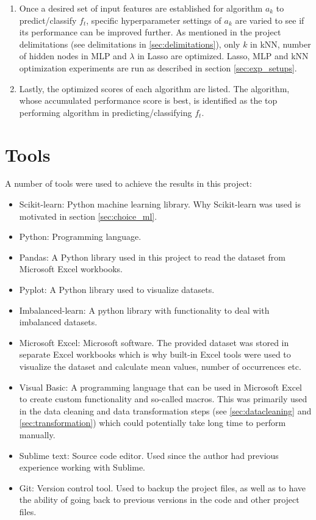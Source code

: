 \begin{enumerate}
			\item Once a desired set of input features are established for algorithm $a_k$ to predict/classify $f_t$, specific hyperparameter settings of $a_k$ are varied to see if its performance can be improved further. As mentioned in the project delimitations (see delimitations in \ref{sec:delimitations}), only $k$ in kNN, number of hidden nodes in MLP and $\lambda$ in Lasso are optimized. Lasso, MLP and kNN optimization experiments are run as described in section  \ref{sec:exp_setups}.
			\item Lastly, the optimized scores of each algorithm are listed. The algorithm, whose accumulated performance score is best, is identified as the top performing algorithm in predicting/classifying $f_t$.
		\end{enumerate}
		

\section{Tools}
	A number of tools were used to achieve the results in this project:
	\begin{itemize}
		\item{Scikit-learn: } Python machine learning library. Why Scikit-learn was used is motivated in section \ref{sec:choice_ml}.
		\item{Python: } Programming language. 
		\item{Pandas: } A Python library used in this project to read the dataset from Microsoft Excel workbooks.
		\item{Pyplot: } A Python library used to visualize datasets.
		\item{Imbalanced-learn:} A python library with functionality to deal with imbalanced datasets.
		\item{Microsoft Excel: } Microsoft software. The provided dataset was stored in separate Excel workbooks which is why built-in Excel tools were used to visualize the dataset and calculate mean values, number of occurrences etc.
		\item{Visual Basic: } A programming language that can be used in Microsoft Excel to create custom functionality and so-called macros. This was primarily used in the data cleaning and data transformation steps (see \ref{sec:datacleaning} and \ref{sec:transformation}) which could potentially take long time to perform manually.
		\item{Sublime text: } Source code editor. Used since the author had previous experience working with Sublime.
		\item{Git: } Version control tool. Used to backup the project files, as well as to have the ability of going back to previous versions in the code and other project files. 
	\end{itemize}



